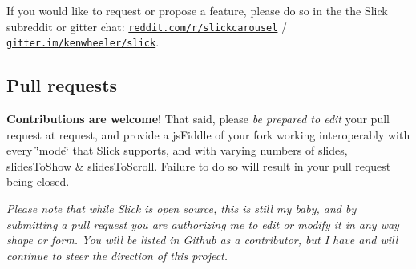 If you would like to request or propose a feature, please do so in the the Slick subreddit or gitter chat\+: \href{http://www.reddit.com/r/slickcarousel/}{\tt reddit.\+com/r/slickcarousel} / \href{https://gitter.im/kenwheeler/slick}{\tt gitter.\+im/kenwheeler/slick}.

\subsection*{Pull requests}

{\bfseries Contributions are welcome}! That said, please {\itshape be prepared to edit} your pull request at request, and provide a js\+Fiddle of your fork working interoperably with every \char`\"{}mode\char`\"{} that Slick supports, and with varying numbers of slides, slides\+To\+Show \& slides\+To\+Scroll. Failure to do so will result in your pull request being closed.

{\itshape Please note that while Slick is open source, this is still my baby, and by submitting a pull request you are authorizing me to edit or modify it in any way shape or form. You will be listed in Github as a contributor, but I have and will continue to steer the direction of this project.} 
